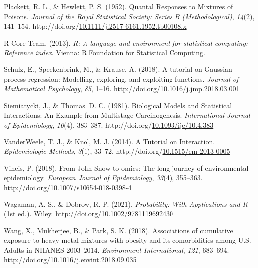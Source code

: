 \documentclass[12pt, twoside]{amherstthesis}
\newenvironment{CSLReferences}[2]%
  {}%
  {\par}
\begin{document}
\begin{CSLReferences}{1}{0}
\leavevmode{}%
Plackett, R. L., \& Hewlett, P. S. (1952). Quantal {Responses} to {Mixtures} of {Poisons}. \emph{Journal of the Royal Statistical Society: Series B (Methodological)}, \emph{14}(2), 141--154. http://doi.org/\href{https://doi.org/10.1111/j.2517-6161.1952.tb00108.x}{10.1111/j.2517-6161.1952.tb00108.x}

\leavevmode{}%
R Core Team. (2013). \emph{R: A language and environment for statistical computing: Reference index}. Vienna: R Foundation for Statistical Computing.

\leavevmode{}%
Schulz, E., Speekenbrink, M., \& Krause, A. (2018). A tutorial on {Gaussian} process regression: {Modelling}, exploring, and exploiting functions. \emph{Journal of Mathematical Psychology}, \emph{85}, 1--16. http://doi.org/\href{https://doi.org/10.1016/j.jmp.2018.03.001}{10.1016/j.jmp.2018.03.001}

\leavevmode{}%
Siemiatycki, J., \& Thomas, D. C. (1981). Biological {Models} and {Statistical} {Interactions}: An {Example} from {Multistage} {Carcinogenesis}. \emph{International Journal of Epidemiology}, \emph{10}(4), 383--387. http://doi.org/\href{https://doi.org/10.1093/ije/10.4.383}{10.1093/ije/10.4.383}

\leavevmode{}%
VanderWeele, T. J., \& Knol, M. J. (2014). A {Tutorial} on {Interaction}. \emph{Epidemiologic Methods}, \emph{3}(1), 33--72. http://doi.org/\href{https://doi.org/10.1515/em-2013-0005}{10.1515/em-2013-0005}

\leavevmode{}%
Vineis, P. (2018). From {John} {Snow} to omics: The long journey of environmental epidemiology. \emph{European Journal of Epidemiology}, \emph{33}(4), 355--363. http://doi.org/\href{https://doi.org/10.1007/s10654-018-0398-4}{10.1007/s10654-018-0398-4}

\leavevmode{}%
Wagaman, A. S., \& Dobrow, R. P. (2021). \emph{Probability: {With} {Applications} and {R}} (1st ed.). Wiley. http://doi.org/\href{https://doi.org/10.1002/9781119692430}{10.1002/9781119692430}

\leavevmode{}%
Wang, X., Mukherjee, B., \& Park, S. K. (2018). Associations of cumulative exposure to heavy metal mixtures with obesity and its comorbidities among {U}.{S}. Adults in {NHANES} 2003--2014. \emph{Environment International}, \emph{121}, 683--694. http://doi.org/\href{https://doi.org/10.1016/j.envint.2018.09.035}{10.1016/j.envint.2018.09.035}


\end{CSLReferences}
\end{document}
